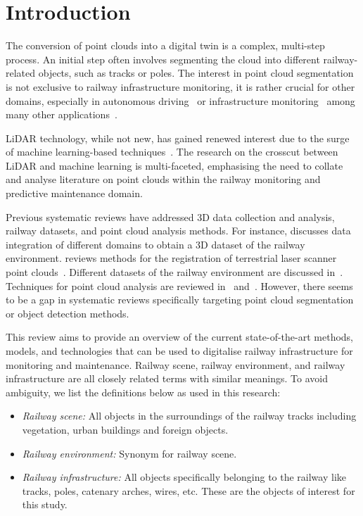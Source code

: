 \section{Introduction}\label{sec:stoa:introduction}
The conversion of point clouds into a digital twin is a complex, multi-step process. An initial step often involves segmenting the cloud into different railway-related objects, such as tracks or poles. The interest in point cloud segmentation is not exclusive to railway infrastructure monitoring, it is rather crucial for other domains, especially in autonomous driving~\cite{li2020deep} or infrastructure monitoring~\cite{mirzaei20223d} among many other applications~\cite{nguyen_3d_2013}. 

LiDAR technology, while not new, has gained renewed interest due to the surge of machine learning-based techniques~\cite{li20193d}. The research on the crosscut between LiDAR and machine learning is multi-faceted, emphasising the need to collate and analyse literature on point clouds within the railway monitoring and predictive maintenance domain.

Previous systematic reviews have addressed 3D data collection and analysis, railway datasets, and point cloud analysis methods. For instance, \cite{corongiu2018data} discusses data integration of different domains to obtain a 3D dataset of the railway environment. \citeauthor{dong2020registration} reviews methods for the registration of terrestrial laser scanner point clouds~\cite{dong2020registration}. Different datasets of the railway environment are discussed in~\cite{pappaterra2021systematic}. Techniques for point cloud analysis are reviewed in~\cite{li20193d} and~\cite{klimkowska2022detailed}. However, there seems to be a gap in systematic reviews specifically targeting point cloud segmentation or object detection methods.

This review aims to provide an overview of the current state-of-the-art methods, models, and technologies that can be used to digitalise railway infrastructure for monitoring and maintenance. 
Railway scene, railway environment, and railway infrastructure are all closely related terms with similar meanings. To avoid ambiguity, we list the definitions below as used in this research:
 \begin{itemize}
     \item \emph{Railway scene:} All objects in the surroundings of the railway tracks including vegetation, urban buildings and foreign objects.
     \item \emph{Railway environment:} Synonym for railway scene. 
     \item \emph{Railway infrastructure:} All objects specifically belonging to the railway like tracks, poles, catenary arches, wires, etc. These are the objects of interest for this study.
 \end{itemize}

